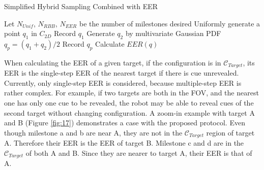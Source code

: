 \documentclass[12pt,draftcls,onecolumn]{IEEEtran}
\begin{document}
\begin{algorithm}
   \caption{Simplified Hybrid Sampling Combined with EER}
    \begin{algorithmic}[1]
        \State Let $N_{Unif}$, $N_{RBB}$, $N_{EER}$ be the number of milestones desired
            \State Uniformly generate a point $q_1$ in $C_{2D}$  
	 \State Record $q_1$
	 \Else
             \State Generate $q_2$ by multivariate Gaussian PDF
	  \State $q_p = (q_1+q_2)/2$	
	  \State Record $q_p$
	  \EndIf 	
             \EndIf 
	 \EndWhile	 
	 \EndIf
        \EndWhile
        \State Calculate $EER(q)$ 
        \EndWhile
      
       \EndFunction
\end{algorithmic}
\end{algorithm}

\clearpage



%



When calculating the EER of a given target, if the configuration is in $\mathcal{C}_{Target}$, its EER is the single-step EER of the nearest target if there is cue unrevealed. 
Currently, only single-step EER is considered, because multiple-step EER is rather complex.
 For example, if two targets are both in the FOV, and the nearest one has only one cue to be revealed, the robot may be able to reveal cues of the second target without changing configuration.
A zoom-in example with target A and B (Figure \ref{fig:17}) demonstrates a case with the proposed protocol.
Even though milestone a and b are near A, they are not in the  $\mathcal{C}_{Target}$ region of target A. 
Therefore their EER is the EER of target B.
Milestone c and d are in the $\mathcal{C}_{Target}$ of both A and B. 
Since they are nearer to target A, their EER is that of A.
\end{document}
